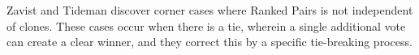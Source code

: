 Zavist and Tideman discover corner cases where Ranked Pairs is not independent of clones.  These cases occur when there is a tie, wherein a single additional vote can create a clear winner, and they correct this by a specific tie-breaking process.

